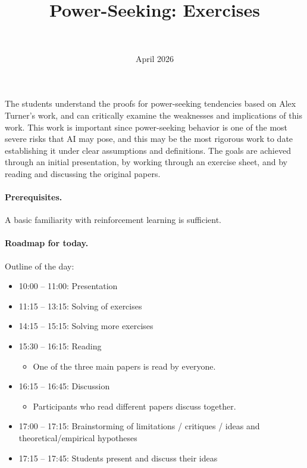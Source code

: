 \documentclass[11pt]{article}
\title{Power-Seeking: Exercises}
\author{\authorname{Leon Lang}\\ \affiliation{ILIAD}}
\date{April 2026}
\begin{document}
\maketitle

\begin{learningoutcomes}
The students understand the proofs for power-seeking tendencies based on Alex
Turner's work, and can critically examine the weaknesses and implications of
this work. This work is important since power-seeking behavior is one of the
most severe risks that AI may pose, and this may be the most rigorous work to
date establishing it under clear assumptions and definitions. The goals are
achieved through an initial presentation, by working through an exercise sheet,
and by reading and discussing the original papers.
\end{learningoutcomes}

\paragraph{Prerequisites.}

A basic familiarity with reinforcement learning is sufficient.

\paragraph{Roadmap for today.}

Outline of the day:

\begin{itemize}
  \item 10:00 -- 11:00: Presentation
  \item 11:15 -- 13:15: Solving of exercises
  \item 14:15 -- 15:15: Solving more exercises
  \item 15:30 -- 16:15: Reading
\begin{itemize}
  \item One of the three main papers is read by everyone.
\end{itemize}
  \item 16:15 -- 16:45: Discussion
\begin{itemize}
  \item Participants who read different papers discuss together.
\end{itemize}
  \item 17:00 -- 17:15: Brainstorming of limitations / critiques / ideas and theoretical/empirical hypotheses
  \item 17:15 -- 17:45: Students present and discuss their ideas
\end{itemize}
\end{document}
